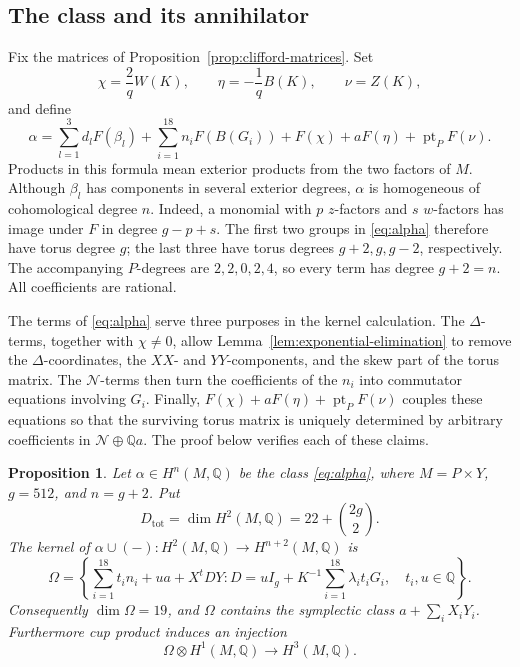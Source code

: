 \documentclass[11pt]{article}
\numberwithin{equation}{section}
\newtheorem{proposition}[theorem]{Proposition}
\theoremstyle{definition}
\theoremstyle{remark}
\newcommand{\Q}{\mathbb Q}
\newcommand{\pt}{\operatorname{pt}}
\begin{document}
\subsection{The class and its annihilator}

Fix the matrices of Proposition~\ref{prop:clifford-matrices}.  Set
\begin{equation}\label{eq:auxiliary-exterior-forms}
 \chi=\frac2q W(K),\qquad
 \eta=-\frac1q B(K),\qquad
 \nu=Z(K),
\end{equation}
and define
\begin{equation}\label{eq:alpha}
 \alpha=\sum_{l=1}^3 d_lF(\beta_l)
       +\sum_{i=1}^{18}n_iF(B(G_i))
       +F(\chi)+aF(\eta)+\pt_PF(\nu).
\end{equation}
Products in this formula mean exterior products from the two factors
of $M$.  Although $\beta_l$ has components in several exterior
degrees, $\alpha$ is homogeneous of cohomological degree $n$.
Indeed, a monomial with $p$ $z$-factors and $s$ $w$-factors has image
under $F$ in degree $g-p+s$.  The first two groups in
\eqref{eq:alpha} therefore have torus degree $g$; the last three
have torus degrees $g+2,g,g-2$, respectively.  The accompanying
$P$-degrees are $2,2,0,2,4$, so every term has degree $g+2=n$.
All coefficients are rational.

The terms of \eqref{eq:alpha} serve three purposes in the kernel
calculation.  The $\Delta$-terms, together with $\chi\ne0$, allow
Lemma~\ref{lem:exponential-elimination} to remove the $\Delta$-coordinates,
the $XX$- and $YY$-components, and the skew part of the torus matrix.
The $\mathcal N$-terms then turn the coefficients of the $n_i$ into
commutator equations involving $G_i$.  Finally,
$F(\chi)+aF(\eta)+\pt_PF(\nu)$ couples these equations so that the
surviving torus matrix is uniquely determined by arbitrary coefficients
in $\mathcal N\oplus\Q a$.  The proof below verifies each of these claims.

\begin{proposition}\label{prop:cup-kernel}
Let $\alpha\in H^n(M,\Q)$ be the class \eqref{eq:alpha}, where
$M=P\times Y$, $g=512$, and $n=g+2$.  Put
\[
 D_{\mathrm{tot}}=\dim H^2(M,\Q)=22+\binom{2g}{2}.
\]
The kernel of
$\alpha\cup(-):H^2(M,\Q)\longrightarrow H^{n+2}(M,\Q)$ is
\begin{equation}\label{eq:omega}
 \Omega=\left\{
   \sum_{i=1}^{18}t_i n_i+ua+X^tDY:
   D=uI_g+K^{-1}\sum_{i=1}^{18}\lambda_i t_iG_i,
   \quad t_i,u\in\Q\right\}.
\end{equation}
Consequently $\dim\Omega=19$, and $\Omega$ contains the symplectic
class $a+\sum_iX_iY_i$.  Furthermore cup product induces an injection
\begin{equation}\label{eq:omega-h1-injective}
 \Omega\otimes H^1(M,\Q)\longrightarrow H^3(M,\Q).
\end{equation}
\end{proposition}
\end{document}
